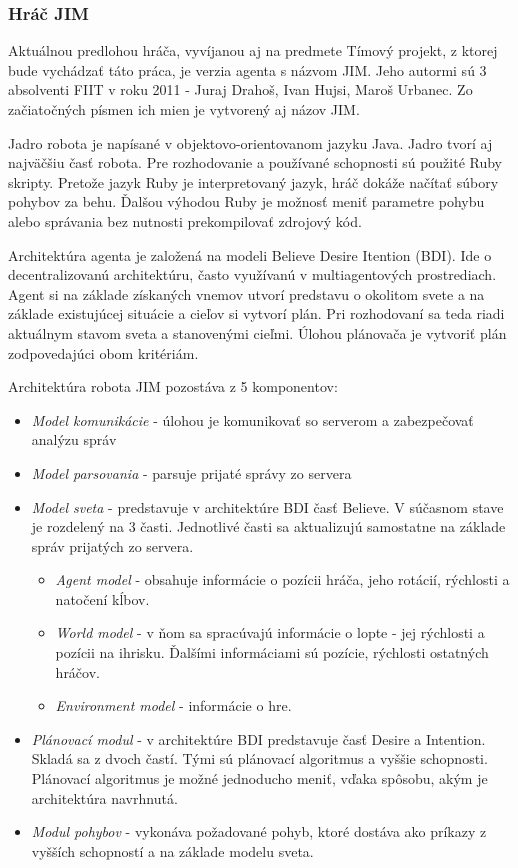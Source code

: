 \subsubsection{Hráč JIM}
	\label{jim}
Aktuálnou predlohou hráča, vyvíjanou aj na predmete Tímový projekt, z ktorej bude vychádzať táto práca, je verzia agenta s názvom JIM. Jeho autormi sú 3 absolventi FIIT v roku 2011 - Juraj Drahoš, Ivan Hujsi, Maroš Urbanec. Zo začiatočných písmen ich mien je vytvorený aj názov JIM.

Jadro robota je napísané v objektovo-orientovanom jazyku Java. Jadro tvorí aj najväčšiu časť robota. Pre rozhodovanie a používané schopnosti sú použité Ruby skripty. Pretože jazyk Ruby je interpretovaný jazyk, hráč dokáže načítať súbory pohybov za behu. Ďalšou výhodou Ruby je možnosť meniť parametre pohybu alebo správania bez nutnosti prekompilovať zdrojový kód.

Architektúra agenta je založená na modeli Believe Desire Itention (BDI). Ide o decentralizovanú architektúru, často využívanú v multiagentových prostrediach. Agent  si  na  základe  získaných  vnemov  utvorí  predstavu  o  okolitom   svete  a  na  základe existujúcej  situácie  a  cieľov  si  vytvorí  plán.  Pri  rozhodovaní  sa  teda  riadi  aktuálnym stavom  sveta  a stanovenými  cieľmi.  Úlohou  plánovača je  vytvoriť  plán  zodpovedajúci  obom kritériám.

Architektúra robota JIM pozostáva z 5 komponentov:

\begin{itemize}
	\item \textit{Model komunikácie} - úlohou je komunikovať so serverom a zabezpečovať analýzu správ
	\item \textit{Model parsovania} - parsuje prijaté správy zo servera
	\item \textit{Model sveta} - predstavuje v architektúre BDI časť Believe. V súčasnom stave je rozdelený na 3 časti. Jednotlivé časti sa aktualizujú samostatne na základe správ prijatých zo servera.
		\begin{itemize}
			\item \textit{Agent model} - obsahuje informácie o pozícii hráča, jeho rotácií, rýchlosti a natočení kĺbov.
			\item \textit{World model} - v ňom sa spracúvajú informácie o lopte - jej rýchlosti a pozícii na ihrisku. Ďalšími informáciami sú pozície, rýchlosti ostatných hráčov.
			\item \textit{Environment model} - informácie o hre.
		\end{itemize}
	\item \textit{Plánovací modul} - v architektúre BDI predstavuje časť Desire a Intention. Skladá sa z dvoch častí. Tými sú plánovací algoritmus a vyššie schopnosti. Plánovací algoritmus je možné jednoducho meniť, vďaka spôsobu, akým je architektúra navrhnutá.
	\item \textit{Modul pohybov} - vykonáva požadované pohyb, ktoré dostáva ako príkazy z vyšších schopností a na základe modelu sveta.
\end{itemize}

